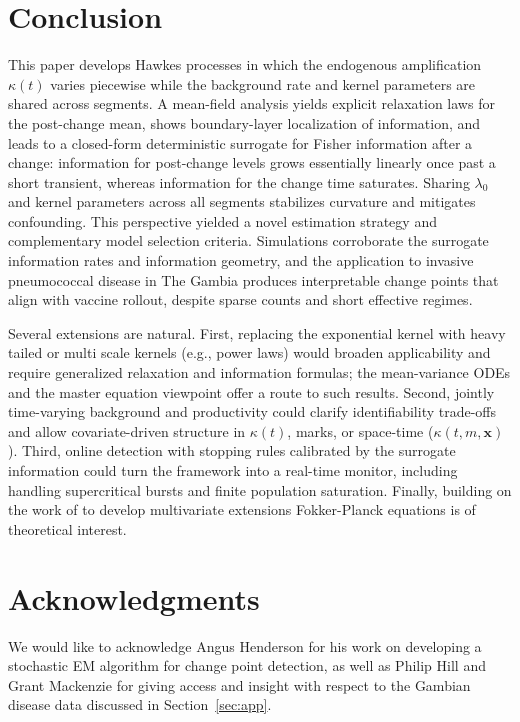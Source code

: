 \documentclass{article}
\theoremstyle{plain}
\theoremstyle{definition}
\newcommand{\1}{\mathbf{1}}
\begin{document}
    
\section{Conclusion}
    This paper develops Hawkes processes in which the endogenous amplification $\kappa(t)$ varies piecewise while the background rate and kernel parameters are shared across segments. A mean-field analysis yields explicit relaxation laws for the post-change mean, shows boundary-layer localization of information, and leads to a closed-form deterministic surrogate for Fisher information after a change: information for post-change levels grows essentially linearly once past a short transient, whereas information for the change time saturates. Sharing $\lambda_0$ and kernel parameters across all segments stabilizes curvature and mitigates confounding. This perspective yielded a novel estimation strategy and complementary model selection criteria. Simulations corroborate the surrogate information rates and information geometry, and the application to invasive pneumococcal disease in The Gambia produces interpretable change points that align with vaccine rollout, despite sparse counts and short effective regimes.
    
    Several extensions are natural. First, replacing the exponential kernel with heavy tailed or multi scale kernels (e.g., power laws) would broaden applicability and require generalized relaxation and information formulas; the mean-variance ODEs and the master equation viewpoint offer a route to such results. Second, jointly time-varying background and productivity could clarify identifiability trade-offs and allow covariate-driven structure in $\kappa(t)$, marks, or space-time ($\kappa(t,m,\mathbf{x})$). Third, online detection with stopping rules calibrated by the surrogate information could turn the framework into a real-time monitor, including handling supercritical bursts and finite population saturation. Finally, building on the work of \cite{kanazawa2020field} to develop multivariate extensions Fokker-Planck equations is of theoretical interest. 
    
    \section{Acknowledgments} We would like to acknowledge Angus Henderson for his work on developing a stochastic EM algorithm for change point detection, as well as Philip Hill and Grant Mackenzie for giving access and insight with respect to the Gambian disease data discussed in Section~\ref{sec:app}.
     
    
\newpage
    \appendix
\end{document}
